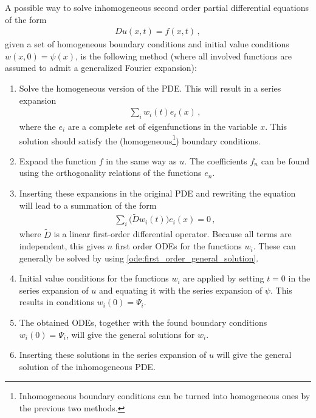     \begin{method}
        A possible way to solve inhomogeneous second order partial differential equations of the form
        \begin{gather}
            Du(x,t) = f(x,t)\,,
        \end{gather}
        given a set of homogeneous boundary conditions and initial value conditions $w(x,0)=\psi(x)$, is the following method (where all involved functions are assumed to admit a generalized Fourier expansion):
        \begin{enumerate}
            \item Solve the homogeneous version of the PDE. This will result in a series expansion
            \begin{gather}
                \sum_iw_i(t)e_i(x)\,,
            \end{gather}
            where the $e_i$ are a complete set of eigenfunctions in the variable $x$. This solution should satisfy the (homogeneous\footnote{Inhomogeneous boundary conditions can be turned into homogeneous ones by the previous two methods.}) boundary conditions.
            \item Expand the function $f$ in the same way as $u$. The coefficients $f_n$ can be found using the orthogonality relations of the functions $e_n$.
            \item Inserting these expansions in the original PDE and rewriting the equation will lead to a summation of the form
            \begin{gather}
                \sum_i\bigl(\widetilde{D}w_i(t)\bigr)e_i(x) = 0\,,
            \end{gather}
            where $\widetilde{D}$ is a linear first-order differential operator. Because all terms are independent, this gives $n$ first order ODEs for the functions $w_i$. These can generally be solved by using \cref{ode:first_order_general_solution}.
            \item Initial value conditions for the functions $w_i$ are applied by setting $t=0$ in the series expansion of $u$ and equating it with the series expansion of $\psi$. This results in conditions $w_i(0) = \Psi_i$.
            \item The obtained ODEs, together with the found boundary conditions $w_i(0) = \Psi_i$, will give the general solutions for $w_i$.
            \item Inserting these solutions in the series expansion of $u$ will give the general solution of the inhomogeneous PDE.
        \end{enumerate}
    \end{method}

